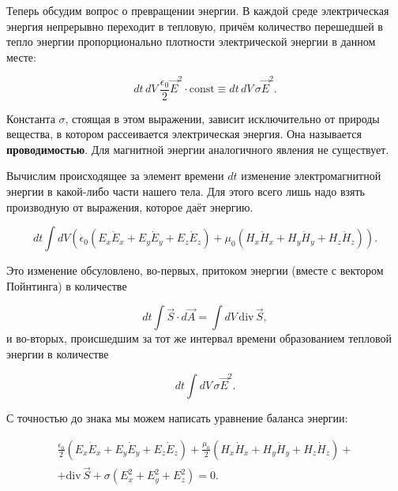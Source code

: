 \documentclass[11pt,a4paper]{article}
\numberwithin{equation}{section}
\newcommand{\nn}{\nonumber}
\renewcommand{\div}{\mathrm{div}\,}
\newcommand{\eps}{\epsilon}
\newcommand{\const}{\mathrm{const}}
\begin{document}
Теперь обсудим вопрос о превращении энергии. В каждой среде
электрическая энергия непрерывно переходит в тепловую, причём
количество перешедшей в тепло энергии пропорционально плотности
электрической энергии в данном месте:

\begin{equation}
  \label{eq:def_heat_from_electric}
  dt\, dV\, \frac{\eps_0}{2} \vec{E}^2 \cdot \const \equiv dt\, dV\,
  \sigma \vec{E}^2.
\end{equation}

Константа $\sigma$, стоящая в этом выражении, зависит исключительно от
природы вещества, в котором рассеивается электрическая энергия. Она
называется \textbf{проводимостью}. Для магнитной энергии аналогичного
явления не существует.

Вычислим происходящее за элемент времени $dt$ изменение
электромагнитной энергии в какой-либо части нашего тела. Для этого
всего лишь надо взять производную от выражения, которое даёт энергию. 

\begin{equation}
  \label{eq:conserv_energy_der_1}
  dt \int dV \left( \eps_0 (E_x \dot{E}_x + E_y \dot{E}_y +
    E_z \dot{E}_z) + \mu_0 (H_x \dot{H}_x + H_y \dot{H}_y +
    H_z \dot{H}_z) \right).
\end{equation}

Это изменение обсуловлено, во-первых, притоком энергии (вместе с
вектором Пойнтинга) в количестве

\begin{equation}
  \label{eq:conserv_energy_der_2}
  dt \int \vec{S} \cdot d\vec{A} =  \int dV\, \div \vec{S} ,
\end{equation}
и во-вторых, происшедшим за тот же интервал времени образованием
тепловой энергии в количестве 

\begin{equation}
  \label{eq:conserv_energy_der_3}
  dt \int dV\, \sigma \vec{E}^2.
\end{equation}

С точностью до знака мы можем написать уравнение баланса энергии: 

\begin{eqnarray}
  \label{eq:conserv_energy_der_4}
\nn
  \frac{\eps_0}{2} \left(E_x \dot{E}_x + E_y \dot{E}_y +
    E_z \dot{E}_z \right) +   \frac{\mu_0}{2} \left(H_x \dot{H}_x + H_y \dot{H}_y +
    H_z \dot{H}_z \right) + \\
+ \div \vec{S} + \sigma \left(E_x^2 + E_y^2 +E_z^2 \right) =0.
\end{eqnarray}
\end{document}
